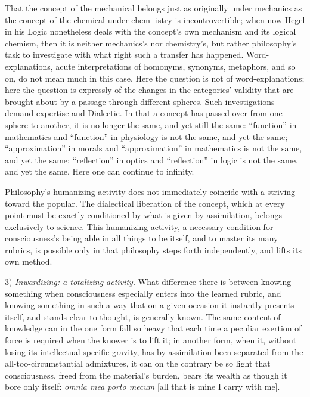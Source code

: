 \documentclass[12pt]{book}
\begin{document}
That the concept of the mechanical belongs just as originally under mechanics as the concept of the
chemical under chem-
istry is incontrovertible; when now Hegel in his Logic nonetheless deals with the concept's own
mechanism and its logical chemism, then it is neither mechanics's nor chemistry's, but rather
philosophy's task to investigate with what right such a transfer has happened. Word-explanations, acute
interpretations of homonyms, synonyms, metaphors, and so on, do not mean much in this case. Here the
question is not of word-explanations; here the question is expressly of the changes in the categories'
validity that are brought about by a passage through different spheres. Such investigations demand
expertise and Dialectic. In that a concept has passed over from one sphere to another, it is no longer
the same, and yet still the same: ``function'' in mathematics and ``function'' in physiology is not the
same, and yet the same; ``approximation'' in morals and ``approximation'' in mathematics is not the same,
and yet the same; ``reflection'' in optics and ``reflection'' in logic is not the same, and yet the same.
Here one can continue to infinity.

Philosophy's humanizing activity does not immediately coincide with a striving toward the popular. The
dialectical liberation of the concept, which at every point must be exactly conditioned by what is given
by assimilation, belongs exclusively to science. This humanizing activity, a necessary condition for
consciousness's being able in all things to be itself, and to master its many rubrics, is possible only
in that philosophy steps forth independently, and lifts its own method.

3) \emph{Inwardizing: a totalizing activity.} What difference there is between knowing something when
consciousness especially enters into the learned rubric, and knowing something in such a way that on a
given occasion it instantly presents itself, and stands clear to thought, is generally known. The same
content of knowledge can in the one form fall so heavy that each time a peculiar exertion of
force is required when the knower is to lift it; in another form, when it, without losing its
intellectual specific gravity, has by assimilation been separated from the all-too-circumstantial
admixtures, it can on the contrary be so light that consciousness, freed from the material's burden,
bears its wealth as though it bore only itself: \textit{omnia mea porto mecum} [all that is mine I
carry with me].
\end{document}
